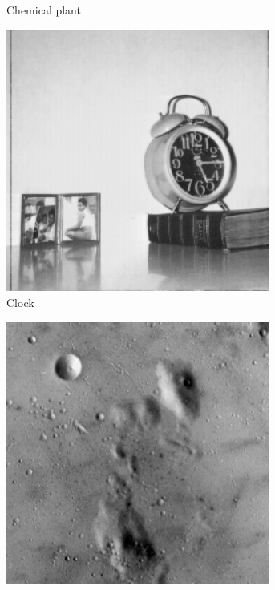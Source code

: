 \begin{figure}
\begin{subfigure}[b]{.3\textwidth}
  \caption{Chemical plant }
  \label{fig:test-images-chemicalplant}
\end{subfigure}
\begin{subfigure}[b]{.3\textwidth}
  \centering
  \includegraphics[width=0.95\textwidth]{figures/test-images/original/clock}
  \caption{Clock}
  \label{fig:test-images-clock}
\end{subfigure}
\begin{subfigure}[b]{.3\textwidth}
  \centering
  \includegraphics[width=0.95\textwidth]{figures/test-images/original/moonsurface}

\end{subfigure}
\end{figure}
